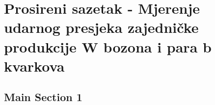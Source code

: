 
\chapter{Prosireni sazetak - Mjerenje udarnog presjeka zajedničke produkcije W bozona i para b kvarkova} %

\label{Chapter8} %



\section{Main Section 1}


